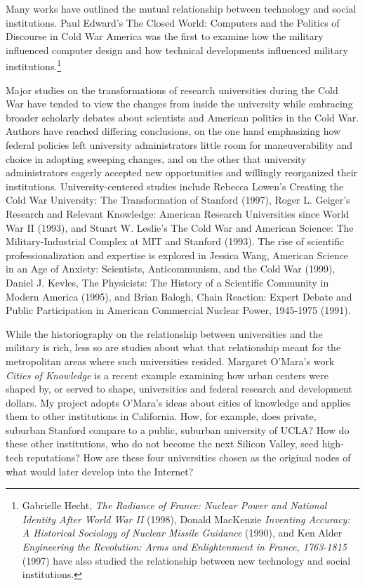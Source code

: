 \documentclass[11pt,article,oneside]{memoir}
\begin{document}
Many works have outlined the mutual relationship between technology and
social institutions. Paul Edward's The Closed World: Computers and the
Politics of Discourse in Cold War America was the first to examine how
the military influenced computer design and how technical developments
influenced military institutions.\footnote{Gabrielle Hecht, \emph{The
  Radiance of France: Nuclear Power and National Identity After World
  War II} (1998), Donald MacKenzie \emph{Inventing Accuracy: A
  Historical Sociology of Nuclear Missile Guidance} (1990), and Ken
  Alder \emph{Engineering the Revolution: Arms and Enlightenment in
  France, 1763-1815} (1997) have also studied the relationship between
  new technology and social institutions.}

Major studies on the transformations of research universities during the
Cold War have tended to view the changes from inside the university
while embracing broader scholarly debates about scientists and American
politics in the Cold War. Authors have reached differing conclusions, on
the one hand emphasizing how federal policies left university
administrators little room for maneuverability and choice in adopting
sweeping changes, and on the other that university administrators
eagerly accepted new opportunities and willingly reorganized their
institutions. University-centered studies include Rebecca Lowen's
Creating the Cold War University: The Transformation of Stanford (1997),
Roger L. Geiger's Research and Relevant Knowledge: American Research
Universities since World War II (1993), and Stuart W. Leslie's The Cold
War and American Science: The Military-Industrial Complex at MIT and
Stanford (1993). The rise of scientific professionalization and
expertise is explored in Jessica Wang, American Science in an Age of
Anxiety: Scientists, Anticommunism, and the Cold War (1999), Daniel J.
Kevles, The Physicists: The History of a Scientific Community in Modern
America (1995), and Brian Balogh, Chain Reaction: Expert Debate and
Public Participation in American Commercial Nuclear Power, 1945-1975
(1991).

While the historiography on the relationship between universities and
the military is rich, less so are studies about what that relationship
meant for the metropolitan areas where such universities resided.
Margaret O'Mara's work \emph{Cities of Knowledge} is a recent example
examining how urban centers were shaped by, or served to shape,
universities and federal research and development dollars. My project
adopts O'Mara's ideas about cities of knowledge and applies them to
other institutions in California. How, for example, does private,
suburban Stanford compare to a public, suburban university of UCLA? How
do these other institutions, who do not become the next Silicon Valley,
seed high-tech reputations? How are these four universities chosen as
the original nodes of what would later develop into the Internet?
\end{document}

